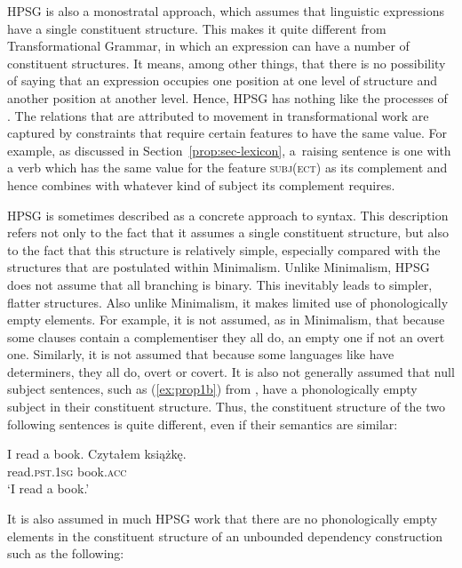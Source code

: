 \documentclass[output=paper,biblatex,babelshorthands,newtxmath,draftmode,colorlinks,citecolor=brown]{langscibook}
\begin{document}
\largerpage[1.5]
HPSG is also a monostratal approach, which assumes that linguistic expressions have a single
constituent structure. This makes it quite different from Transformational Grammar, in which an
expression can have a number of constituent structures. It means, among other things, that there is
no possibility of saying that an expression occupies one position at one level of structure and
another position at another level. Hence, HPSG has nothing like the  processes of
. The relations that are attributed to movement in transformational work are
captured by constraints that require certain features to have the same value. For example, as
discussed in Section~\ref{prop:sec-lexicon}, a~raising sentence is one with a verb which has the
same value for the feature \textsc{subj(ect)} as its complement and hence combines with whatever
kind of subject its complement requires. 

HPSG is sometimes described as a concrete approach to syntax. This description refers not only to
the fact that it assumes a single constituent structure, but also to the fact that this structure is
relatively simple, especially compared with the structures that are postulated within
Minimalism\indexmp. Unlike Minimalism, HPSG does not assume that all branching
is binary. This inevitably leads to simpler, flatter structures. Also unlike Minimalism, it makes
limited use of phonologically empty elements. For example, it is not assumed, as in Minimalism, that
because some clauses contain a complementiser they all do, an empty one if not an overt
one. Similarly, it is not assumed that because some languages like  have determiners, they
all do, overt or covert. It is also not generally assumed that null subject sentences, such as
(\ref{ex:prop1b}) from , have a phonologically empty subject in their constituent
structure. Thus, the constituent structure of the two following sentences is quite different, even
if their semantics are similar:

\eal\label{ex:prop1}
\ex\label{ex:prop1a}
I read a book.
\ex\label{ex:prop1b}
\gll Czytałem książkę.\\
     read\textsc{.pst.1sg} book\textsc{.acc}\\
\glt `I read a book.'
\zl

\noindent
It is also assumed in much HPSG work that there are no phonologically empty elements in the
constituent structure of an unbounded dependency construction such as the following:
\end{document}
